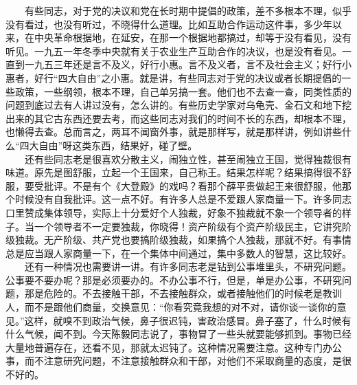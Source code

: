 \documentclass[cn,11pt,chinese]{elegantbook}
\begin{document}
　　有些同志，对于党的决议和党在长时期中提倡的政策，差不多根本不理，似乎没有看过，也没有听过，不晓得什么道理。比如互助合作运动这件事，多少年以来，在中央革命根据地，在延安，在那一个根据地都搞过，却等于没有看见，没有听见。一九五一年冬季中央就有关于农业生产互助合作的决议，也是没有看见。一直到一九五三年还是言不及义，好行小惠。言不及义者，言不及社会主义；好行小惠者，好行“四大自由”之小惠。就是讲，有些同志对于党的决议或者长期提倡的一些政策，一些纲领，根本不理，自己单另搞一套。他们也不去查一查，同类性质的问题到底过去有人讲过没有，怎么讲的。有些历史学家对乌龟壳、金石文和地下挖出来的其它古东西还要去考，而这些同志对我们的时间不长的东西，却根本不理，也懒得去查。总而言之，两耳不闻窗外事，就是那样写，就是那样讲，例如讲些什么“四大自由”呀这类东西，结果好，碰了壁。\\
　　还有些同志老是很喜欢分散主义，闹独立性，甚至闹独立王国，觉得独裁很有味道。原先是图舒服，立起一个王国来，自己称王。结果怎样呢？结果搞得很不舒服，要受批评。不是有个《大登殿》的戏吗？看那个薛平贵做起王来很舒服，他那个时候没有自我批评。这一点不好。有许多人总是不爱跟人家商量一下。许多同志口里赞成集体领导，实际上十分爱好个人独裁，好象不独裁就不象一个领导者的样子。当一个领导者不一定要独裁，你晓得！资产阶级有个资产阶级民主，它讲究阶级独裁。无产阶级、共产党也要搞阶级独裁，如果搞个人独裁，那就不好。有事情总是应当跟人家商量一下，在一个集体中间通过，集中多数人的智慧，这比较好。\\
　　还有一种情况也需要讲一讲。有许多同志老是钻到公事堆里头，不研究问题。公事要不要办呢？那是必须要办的。不办公事不行，但是，单是办公事，不研究问题，那是危险的。不去接触干部，不去接触群众，或者接触他们的时候老是教训人，而不是跟他们商量，交换意见：“你看究竟我想的对不对，请你谈一谈你的意见。”这样，就嗅不到政治气候，鼻子很迟钝，害政治感冒。鼻子塞了，什么时候有什么气候，闻不到。今天陈毅同志说了，事物冒了一些头就要能够抓到。事物已经大量地普遍存在，还看不见，那就太迟钝了。这种情况需要注意。这种专门办公事，而不注意研究问题，不注意接触群众和干部，对他们不采取商量的态度，是很不好的。\\
\end{document}
